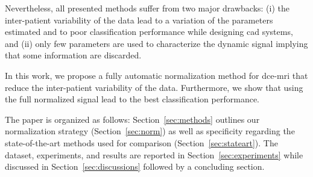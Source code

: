 Nevertheless, all presented methods suffer from two major drawbacks:
(i) the inter-patient variability of the data lead to a variation of the parameters estimated and to poor classification performance while designing \ac{cad} systems, and
(ii) only few parameters are used to characterize the dynamic signal implying that some information are discarded.

In this work, we propose a fully automatic normalization method for \ac{dce}-\ac{mri} that reduce the inter-patient variability of the data.
Furthermore, we show that using the full normalized signal lead to the best classification performance.

The paper is organized as follows: Section~\ref{sec:methods} outlines our normalization strategy (Section~\ref{sec:norm}) as well as specificity regarding the state-of-the-art methods used for comparison (Section~\ref{sec:stateart}). The dataset, experiments, and results are reported in Section~\ref{sec:experiments} while discussed in Section~\ref{sec:discussions} followed by a concluding section.

